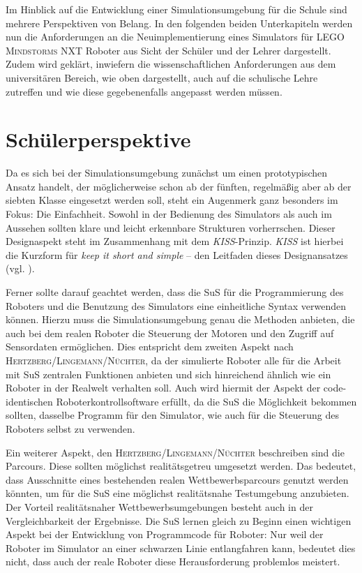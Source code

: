 \documentclass[paper=a4, DIV=calc, BCOR=12mm, twoside=on, onecolumn=on, open = right, titlepage =on, parskip =half-, headsepline = on, footsepline = off, chapterprefix = off, appendixprefix = on, fontsize = 12pt, numbers = noenddot, abstract = on]{scrbook}
\begin{document}
Im Hinblick auf die Entwicklung einer Simulationsumgebung für die Schule sind mehrere Perspektiven von Belang. 
In den folgenden beiden Unterkapiteln werden nun die Anforderungen an die Neuimplementierung eines Simulators für \textsc{LEGO Mindstorms} NXT Roboter aus Sicht der Schüler und der Lehrer dargestellt. Zudem wird geklärt, inwiefern die wissenschaftlichen Anforderungen aus dem universitären Bereich, wie oben dargestellt, auch auf die schulische Lehre zutreffen und wie diese gegebenenfalls angepasst werden müssen.
\vspace*{-1ex}
\par \singlespacing
\section{Schülerperspektive}
\label{sec:schüler}
\onehalfspacing

Da es sich bei der Simulationsumgebung zunächst um einen prototypischen Ansatz handelt, der möglicherweise schon ab der fünften, regelmäßig aber ab der siebten Klasse eingesetzt werden soll, steht ein Augenmerk ganz besonders im Fokus: Die Einfachheit. Sowohl in der Bedienung des Simulators als auch im Aussehen sollten klare und leicht erkennbare Strukturen vorherrschen. Dieser Designaspekt steht im Zusammenhang mit dem \emph{KISS}-Prinzip. \emph{KISS} ist hierbei die Kurzform für \emph{keep it short and simple} -- den Leitfaden dieses Designansatzes (vgl. \cite[S. 144f.]{moser:12}).

Ferner sollte darauf geachtet werden, dass die SuS für die Programmierung des Roboters und die Benutzung des Simulators eine einheitliche Syntax verwenden können. Hierzu muss die Simulationsumgebung genau die Methoden anbieten, die auch bei dem realen Roboter die Steuerung der Motoren und den Zugriff auf Sensordaten ermöglichen. Dies entspricht dem zweiten Aspekt nach \textsc{Hertz\-berg\-/\-Lin\-ge\-mann\-/Nüch\-ter}, da der simulierte Roboter alle für die Arbeit mit SuS zentralen Funktionen anbieten und sich hinreichend ähnlich wie ein Roboter in der Realwelt verhalten soll. Auch wird hiermit der Aspekt der code-identischen Roboterkontrollsoftware erfüllt, da die SuS die Möglichkeit bekommen sollten, dasselbe Programm für den Simulator, wie auch für die Steuerung des Roboters selbst zu verwenden.

Ein weiterer Aspekt, den \textsc{Hertz\-berg\-/\-Lin\-ge\-mann\-/Nüch\-ter} beschreiben sind die Parcours. Diese sollten möglichst realitätsgetreu umgesetzt werden. Das bedeutet, dass Ausschnitte eines bestehenden realen Wettbewerbsparcours genutzt werden könnten, um für die SuS eine möglichst realitätsnahe Testumgebung anzubieten. Der Vorteil realitätsnaher Wettbewerbsumgebungen besteht auch in der Vergleichbarkeit der Ergebnisse. Die SuS lernen gleich zu Beginn einen wichtigen Aspekt bei der Entwicklung von Programmcode für Roboter: Nur weil der Roboter im Simulator an einer schwarzen Linie entlangfahren kann, bedeutet dies nicht, dass auch der reale Roboter diese Herausforderung problemlos meistert.
\end{document}
